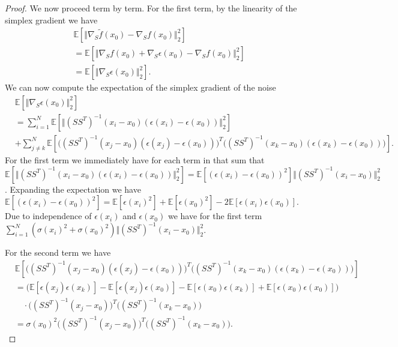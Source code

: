 \begin{proof}
We now proceed term by term. For the first term, by the linearity of the simplex gradient we have
\begin{align}
    &\mathbb{E}[\Vert \nabla_{S} \tilde{f}(x_0) - \nabla_S f(x_0)  \Vert_2^2] \\
    &= \mathbb{E}[\Vert\nabla_S f(x_0) + \nabla_S \epsilon(x_0) - \nabla_S f(x_0) \Vert_2^2 ] \\
    &= \mathbb{E}[\Vert \nabla_S \epsilon(x_0) \Vert_2^2 ].
\end{align}
We can now compute the expectation of the simplex gradient of the noise
\begin{align}
    &\mathbb{E}[\Vert \nabla_S \epsilon(x_0) \Vert_2^2 ] \\
    &=\sum_{i = 1}^N \mathbb{E}[\Vert (SS^T)^{-1} (x_i - x_0) (\epsilon(x_i) - \epsilon(x_0)) \Vert_2^2] \\
    &+ \sum_{j \neq k}^N \mathbb{E}[\Big( (SS^T)^{-1} (x_j - x_0) (\epsilon(x_j) - \epsilon(x_0)) \Big)^T \Big((SS^T)^{-1} (x_k - x_0) (\epsilon(x_k) - \epsilon(x_0)) \Big)].
\end{align}
For the first term we immediately have for each term in that sum that $\mathbb{E}[\Vert (SS^T)^{-1} (x_i - x_0) (\epsilon(x_i) - \epsilon(x_0))\Vert_2^2] = \mathbb{E}[ (\epsilon(x_i) - \epsilon(x_0))^2] \Vert (SS^T)^{-1} (x_i - x_0) \Vert_2^2 $. Expanding the expectation we have $\mathbb{E}[ (\epsilon(x_i) - \epsilon(x_0))^2] = \mathbb{E}[\epsilon(x_i)^2] + \mathbb{E}[\epsilon(x_0)^2] - 2 \mathbb{E}[\epsilon(x_i)\epsilon(x_0)]$. Due to independence of $\epsilon(x_i)$ and $\epsilon(x_0)$ we have for the first term $\sum_{i = 1}^N (\sigma(x_i)^2 + \sigma(x_0)^2) \Vert (SS^T)^{-1} (x_i - x_0) \Vert_2^2$.

For the second term we have
\begin{align}
    &\mathbb{E}[\Big( (SS^T)^{-1} (x_j - x_0) (\epsilon(x_j) - \epsilon(x_0)) \Big)^T \Big((SS^T)^{-1} (x_k - x_0) (\epsilon(x_k) - \epsilon(x_0)) \Big)] \\
    &= \Big(\mathbb{E}[\epsilon(x_j) \epsilon(x_k) ] - \mathbb{E}[\epsilon(x_j) \epsilon(x_0) ] - \mathbb{E}[\epsilon(x_0) \epsilon(x_k) ] + \mathbb{E}[\epsilon(x_0) \epsilon(x_0) ] \Big) \\
    &\quad \cdot \Big( (SS^T)^{-1} (x_j - x_0) \Big)^T \Big((SS^T)^{-1} (x_k - x_0) \Big)\\
    &= \sigma(x_0)^2 \Big( (SS^T)^{-1} (x_j - x_0) \Big)^T \Big((SS^T)^{-1} (x_k - x_0) \Big). 
\end{align}


\end{proof}
